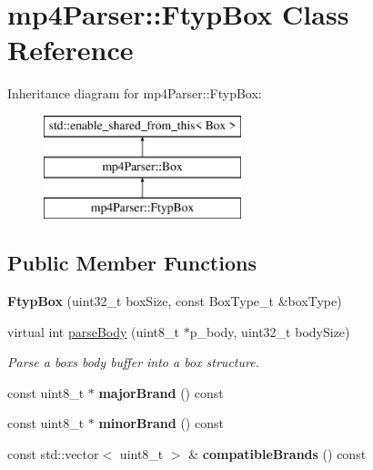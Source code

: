 \hypertarget{classmp4_parser_1_1_ftyp_box}{}\section{mp4\+Parser\+::Ftyp\+Box Class Reference}
\label{classmp4_parser_1_1_ftyp_box}
Inheritance diagram for mp4\+Parser\+::Ftyp\+Box\+:\begin{figure}[H]
\begin{center}
\leavevmode
\includegraphics[height=3.000000cm]{classmp4_parser_1_1_ftyp_box}
\end{center}
\end{figure}
\subsection*{Public Member Functions}
\begin{DoxyCompactItemize}
\item 
\mbox{\label{classmp4_parser_1_1_ftyp_box_a500162b891b4d35928b602392bfb3511}} 
{\bfseries Ftyp\+Box} (uint32\+\_\+t box\+Size, const Box\+Type\+\_\+t \&box\+Type)
\item 
virtual int \mbox{\hyperlink{classmp4_parser_1_1_ftyp_box_a89b1fd7a787bbe00967ab4a34972303b}{parse\+Body}} (uint8\+\_\+t $\ast$p\+\_\+body, uint32\+\_\+t body\+Size)
\begin{DoxyCompactList}\small\item\em Parse a box\textquotesingle{}s body buffer into a box structure. \end{DoxyCompactList}\item 
\mbox{\label{classmp4_parser_1_1_ftyp_box_af0266edcb91596584e54b7a5fcbcd365}} 
const uint8\+\_\+t $\ast$ {\bfseries major\+Brand} () const
\item 
\mbox{\label{classmp4_parser_1_1_ftyp_box_ab804084f28806163585df25e24a89fc5}} 
const uint8\+\_\+t $\ast$ {\bfseries minor\+Brand} () const
\item 
\mbox{\label{classmp4_parser_1_1_ftyp_box_a92bb577a0ffe16dd4d2287913569a973}} 
const std\+::vector$<$ uint8\+\_\+t $>$ \& {\bfseries compatible\+Brands} () const
\end{DoxyCompactItemize}
